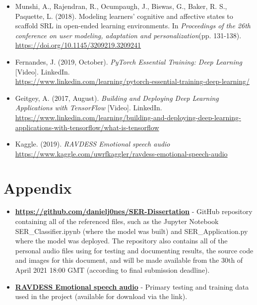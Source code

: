 \documentclass[12pt]{article}
\begin{document}
\begin{itemize}
\item Munshi, A., Rajendran, R., Ocumpaugh, J., Biswas, G., Baker, R. S., Paquette, L. (2018). Modeling learners' cognitive and affective states to scaffold SRL in open-ended learning environments. In \textit{Proceedings of the 26th conference on user modeling, adaptation and personalization}(pp. 131-138). \tab \href{https://doi.org/10.1145/3209219.3209241}{https://doi.org/10.1145/3209219.3209241}

\item Fernandes, J. (2019, October). \textit{PyTorch Essential Training: Deep Learning} [Video]. LinkedIn. \\ \href{https://www.linkedin.com/learning/pytorch-essential-training-deep-learning/welcome?u=2039756}{https://www.linkedin.com/learning/pytorch-essential-training-deep-learning/}

\item Geitgey, A. (2017, August). \textit{Building and Deploying Deep Learning Applications with TensorFlow} [Video]. LinkedIn. \href{https://www.linkedin.com/learning/building-and-deploying-deep-learning-applications-with-tensorflow/what-is-tensorflow?u=2039756}{https://www.linkedin.com/learning/building-and-deploying-deep-learning-applications-with-tensorflow/what-is-tensorflow}

\item Kaggle. (2019). \textit{RAVDESS Emotional speech audio}\\\href{https://www.kaggle.com/uwrfkaggler/ravdess-emotional-speech-audio}{https://www.kaggle.com/uwrfkaggler/ravdess-emotional-speech-audio}
\end{itemize}
\section{Appendix}
\begin{itemize}

\item \href{https://github.com/danielj0nes/SER-Dissertation}{\textbf{https://github.com/danielj0nes/SER-Dissertation}} - GitHub repository containing all of the referenced files, such as the Jupyter Notebook SER\_Classifier.ipynb (where the model was built) and SER\_Application.py where the model was deployed. The repository also contains all of the personal audio files using for testing and documenting results, the source code and images for this document, and will be made available from the 30th of April 2021 18:00 GMT (according to final submission deadline).

\item \href{https://www.kaggle.com/uwrfkaggler/ravdess-emotional-speech-audio}{\textbf{RAVDESS Emotional speech audio}} - Primary testing and training data used in the project (available for download via the link).

\end{itemize}
\end{document}
